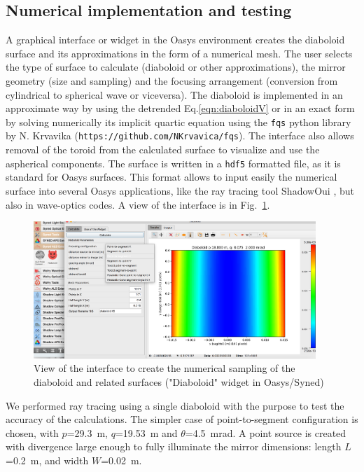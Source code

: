 \documentclass{iucr}              %
\begin{document}
\subsection{Numerical implementation and testing}
\label{sec:oasys}

A graphical interface or widget in the Oasys environment  creates the diaboloid surface and its approximations in the form of a numerical mesh. The user selects the type of surface to calculate (diaboloid or other approximations), the mirror geometry (size and sampling) and the focusing arrangement (conversion from cylindrical to spherical wave or viceversa). 
The diaboloid is implemented in an approximate way by using the detrended Eq.\ref{eqn:diaboloidV} or in an exact form by solving numerically its implicit quartic equation using the {\tt fqs} python library by N. Krvavika ({\tt https://github.com/NKrvavica/fqs}). 
The interface also allows removal of the toroid from the calculated surface to visualize and use the aspherical components. The surface is written in a {\tt hdf5} formatted file, as it is standard for Oasys surfaces. This format allows to input easily the numerical surface into several Oasys applications, like the ray tracing tool ShadowOui \cite{codeSHADOWOUI}, but also in wave-optics codes. A view of the interface is in Fig.~\ref{fig:widget}.

\begin{figure}\label{fig:widget}
\centering
\includegraphics[width=0.95\textwidth]{figures/widget.png}
\caption{View of the interface to create the numerical sampling of the diaboloid and related surfaces ("Diaboloid" widget in Oasys/Syned) }
\end{figure}


We performed ray tracing using a single diaboloid with the purpose to test the accuracy of the calculations. The simpler case of point-to-segment configuration is chosen, with $p$=29.3~m, $q$=19.53~m and $\theta$=4.5~mrad. A point source is created with divergence large enough to fully illuminate the mirror dimensions: length $L$=0.2~m, and width $W$=0.02~m.
\end{document}
